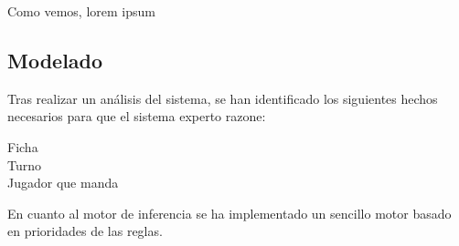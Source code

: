 Como vemos, lorem ipsum

\subsection{Modelado}

Tras realizar un análisis del sistema, se han identificado los siguientes hechos necesarios para que el sistema experto razone:

\begin{description}
\item[Ficha]
\item[Turno]
\item[Jugador que manda]
\end{description}

En cuanto al motor de inferencia se ha implementado un sencillo motor basado en prioridades de las reglas.


